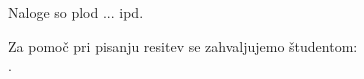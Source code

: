 \thispagestyle{empty}

\vspace*{3cm}

\begin{center}
Naloge so plod ... ipd. 
\end{center}

\medskip

\begin{center}
    Za pomo\v c pri pisanju resitev se zahvaljujemo \v studentom: \\
		\myStudents.
\end{center}